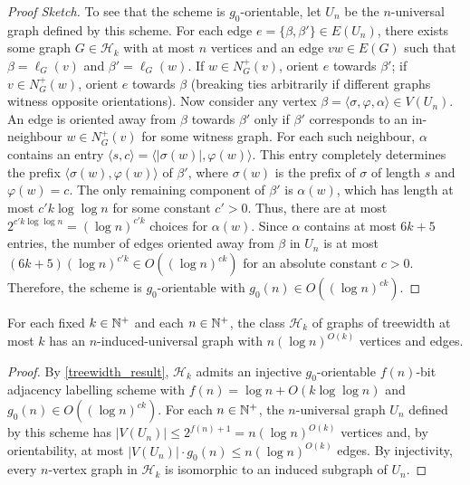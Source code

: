 \documentclass{patmorin}
\renewcommand{\le}{\leqslant}
\newcommand{\Oh}{O}
\newcommand{\calH}{\mathcal{H}}
\begin{document}
\begin{proof}[Proof Sketch]
  To see that the scheme is $g_0$-orientable, let $U_n$ be the $n$-universal graph defined by this scheme. For each edge $e=\{\beta,\beta'\}\in E(U_n)$, there exists some graph $G\in\calH_k$ with at most $n$ vertices and an edge $vw\in E(G)$ such that $\beta=\ell_G(v)$ and $\beta'=\ell_G(w)$. If $w\in N^+_G(v)$, orient $e$ towards $\beta'$; if $v\in N^+_G(w)$, orient $e$ towards $\beta$ (breaking ties arbitrarily if different graphs witness opposite orientations).
  Now consider any vertex $\beta=\langle \sigma,\varphi,\alpha\rangle\in V(U_n)$. An edge is oriented away from $\beta$ towards $\beta'$ only if $\beta'$ corresponds to an in-neighbour $w\in N^+_G(v)$ for some witness graph. For each such neighbour, $\alpha$ contains an entry $\langle s,c\rangle=\langle|\sigma(w)|,\varphi(w)\rangle$. This entry completely determines the prefix $\langle \sigma(w),\varphi(w)\rangle$ of $\beta'$, where $\sigma(w)$ is the prefix of $\sigma$ of length $s$ and $\varphi(w)=c$. The only remaining component of $\beta'$ is $\alpha(w)$, which has length at most $c'k\log\log n$ for some constant $c'>0$. Thus, there are at most $2^{c'k\log\log n} = (\log n)^{c'k}$ choices for $\alpha(w)$. Since $\alpha$ contains at most $6k+5$ entries, the number of edges oriented away from $\beta$ in $U_n$ is at most $(6k+5)(\log n)^{c'k} \in \Oh((\log n)^{ck})$ for an absolute constant $c>0$. Therefore, the scheme is $g_0$-orientable with $g_0(n)\in\Oh((\log n)^{ck})$.
\end{proof}

\begin{cor}\label{cor:treewidth_universal}
  For each fixed $k\in\mathbb{N}^+$ and each $n\in\mathbb{N}^+$, the class $\calH_k$ of graphs of treewidth at most $k$ has an $n$-induced-universal graph with $n(\log n)^{\Oh(k)}$ vertices and edges.
\end{cor}
\begin{proof}
  By \cref{treewidth_result}, $\calH_k$ admits an injective $g_0$-orientable $f(n)$-bit adjacency labelling scheme with $f(n)=\log n + \Oh(k\log\log n)$ and $g_0(n)\in\Oh((\log n)^{ck})$. For each $n\in\mathbb{N}^+$, the $n$-universal graph $U_n$ defined by this scheme has $|V(U_n)|\le 2^{f(n)+1} = n(\log n)^{\Oh(k)}$ vertices and, by orientability, at most $|V(U_n)|\cdot g_0(n) \le n(\log n)^{\Oh(k)}$ edges. By injectivity, every $n$-vertex graph in $\calH_k$ is isomorphic to an induced subgraph of $U_n$.
\end{proof}
\end{document}
